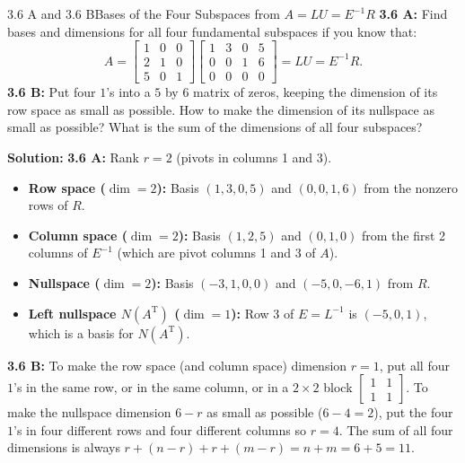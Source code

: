 \documentclass[11pt,a4paper,openany,oneside]{book}
\newcommand{\T}{\mathrm{T}}
\numberwithin{equation}{chapter}
\begin{document}
\begin{example}{3.6 A and 3.6 B}{Bases of the Four Subspaces from $A = LU = E^{-1}R$}
\textbf{3.6 A:} Find bases and dimensions for all four fundamental subspaces if you know that:
\[
A = \begin{bmatrix} 1 & 0 & 0 \\ 2 & 1 & 0 \\ 5 & 0 & 1 \end{bmatrix} \begin{bmatrix} 1 & 3 & 0 & 5 \\ 0 & 0 & 1 & 6 \\ 0 & 0 & 0 & 0 \end{bmatrix} = LU = E^{-1}R.
\]
\textbf{3.6 B:} Put four $1$'s into a $5$ by $6$ matrix of zeros, keeping the dimension of its row space as small as possible. How to make the dimension of its nullspace as small as possible? What is the sum of the dimensions of all four subspaces?
\end{example}
\textbf{Solution:}
\textbf{3.6 A:} Rank $r=2$ (pivots in columns 1 and 3).
\begin{itemize}
\item \textbf{Row space ($\dim = 2$):} Basis $(1,3,0,5)$ and $(0,0,1,6)$ from the nonzero rows of $R$.
\item \textbf{Column space ($\dim = 2$):} Basis $(1,2,5)$ and $(0,1,0)$ from the first 2 columns of $E^{-1}$ (which are pivot columns 1 and 3 of $A$).
\item \textbf{Nullspace ($\dim = 2$):} Basis $(-3,1,0,0)$ and $(-5,0,-6,1)$ from $R$.
\item \textbf{Left nullspace $N(A^\T)$ ($\dim = 1$):} Row 3 of $E = L^{-1}$ is $(-5,0,1)$, which is a basis for $N(A^\T)$.
\end{itemize}
\textbf{3.6 B:} To make the row space (and column space) dimension $r=1$, put all four $1$'s in the same row, or in the same column, or in a $2\times 2$ block $\begin{bmatrix}1&1\\1&1\end{bmatrix}$. To make the nullspace dimension $6-r$ as small as possible ($6-4=2$), put the four $1$'s in four different rows and four different columns so $r=4$. The sum of all four dimensions is always $r + (n-r) + r + (m-r) = n + m = 6 + 5 = 11$.

\end{document}
